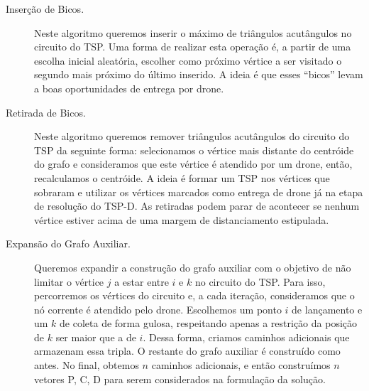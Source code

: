\documentclass[12pt, a4paper]{article}
\begin{document}
\begin{description}
	\item [Inserção de Bicos.] Neste algoritmo queremos inserir o máximo de triângulos acutângulos no circuito do TSP. Uma forma de realizar esta operação é, a partir de uma escolha inicial aleatória, escolher como próximo vértice a ser visitado o segundo mais próximo do último inserido. A ideia é que esses ``bicos'' levam a boas oportunidades de entrega por drone.
	

	\item [Retirada de Bicos.] Neste algoritmo queremos remover triângulos acutângulos do circuito do TSP da seguinte forma: selecionamos o vértice mais distante do centróide do grafo e consideramos que este vértice é atendido por um drone, então, recalculamos o centróide. A ideia é formar um TSP nos vértices que sobraram e utilizar os vértices marcados como entrega de drone já na etapa de resolução do TSP-D. As retiradas podem parar de acontecer se nenhum vértice estiver acima de uma margem de distanciamento estipulada.
	
	
	\item [Expansão do Grafo Auxiliar.] 
	Queremos expandir a construção do grafo auxiliar com o objetivo de não limitar o vértice $j$ a estar entre $i$ e $k$ no circuito do TSP. Para isso, percorremos os vértices do circuito e, a cada iteração, consideramos que o nó corrente é atendido pelo drone. Escolhemos um ponto $i$ de lançamento e um $k$ de coleta de forma gulosa, respeitando apenas a restrição da posição de $k$ ser maior que a de $i$. Dessa forma, criamos caminhos adicionais que armazenam essa tripla. O restante do grafo auxiliar é construído como antes. No final, obtemos $n$ caminhos adicionais, e então construímos $n$ vetores P, C, D para serem considerados na formulação da solução.
	
	
	
\end{description}
\end{document}
